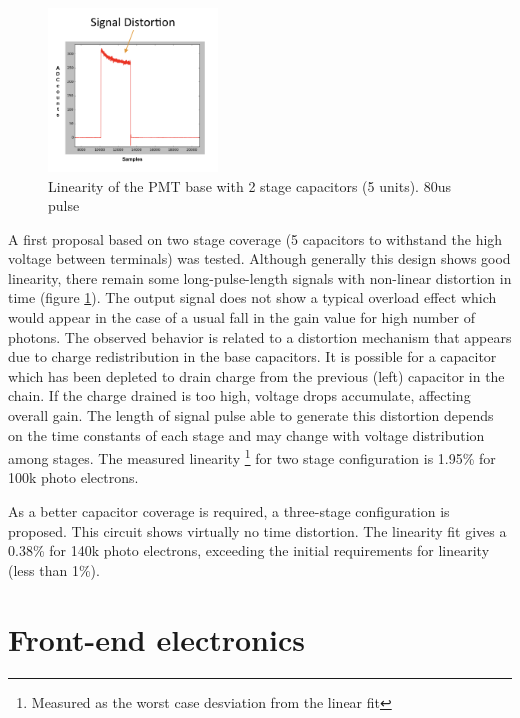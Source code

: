 \documentclass[a4paper, 10pt, oneside, twocolumn, 3p]{elsarticle}
\begin{document}
\begin{figure}
  \begin{center}
    \includegraphics[width=0.4\textwidth]{./figures/5C_base.png}
    \caption{Linearity of the PMT base with 2 stage capacitors (5 units). 80us pulse}
    \label{fig:5C}
  \end{center}
\end{figure}

\par A first proposal based on two stage coverage (5 capacitors to withstand the high voltage between terminals) was tested. Although generally this design shows good linearity, there remain some long-pulse-length signals with non-linear distortion in time (figure \ref{fig:5C}). The output signal does not show a typical overload effect which would appear in the case of a usual fall in the gain value for high number of photons. The observed behavior is related to a distortion mechanism that appears due to charge redistribution in the base capacitors. It is possible for a capacitor which has been depleted to drain charge from the previous (left) capacitor in the chain. If the charge drained is too high, voltage drops accumulate, affecting overall gain. The length of signal pulse able to generate this distortion depends on the time constants of each stage and may change with voltage distribution among stages. The measured linearity \footnote{Measured as the worst case desviation from the linear fit} for two stage configuration is 1.95\% for 100k photo electrons. 

\par As a better capacitor coverage is required, a three-stage configuration is proposed. This circuit shows virtually no time distortion. The linearity fit gives a 0.38\% for 140k photo electrons, exceeding the initial requirements for linearity (less than 1\%).


\section{Front-end electronics}
\end{document}
